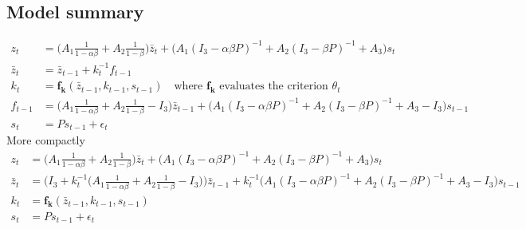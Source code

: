 \documentclass[11pt]{article}
\renewcommand{\[}{\begin{equation}}
\renewcommand{\]}{\end{equation}}
\begin{document}
\subsection{Model summary}
\begin{align}
z_t & = \bigg(A_1\frac{1}{1-\alpha\beta} +A_2\frac{1}{1-\beta}\bigg)\bar{z}_t + \bigg(A_1(I_3 - \alpha\beta P)^{-1} +A_2(I_3 - \beta P)^{-1} +A_3\bigg)s_t \tag{ALM} \\
\bar{z}_t & = \bar{z}_{t-1} + k_t^{-1} f_{t-1} \tag{Drift LOM}\\
k_t & = \mathbf{f_k}(\bar{z}_{t-1}, k_{t-1}, s_{t-1})  \quad \text{where $\mathbf{f_k}$ evaluates the criterion $\theta_t$}\tag{Gain LOM} \\
f_{t-1} & = \bigg(A_1\frac{1}{1-\alpha\beta} +A_2\frac{1}{1-\beta} -I_3\bigg)\bar{z}_{t-1} + \bigg(A_1(I_3 - \alpha\beta P)^{-1} +A_2(I_3 - \beta P)^{-1} +A_3 -I_3\bigg)s_{t-1} \\
s_t &= Ps_{t-1} +\epsilon_t \tag{exog. process}
\end{align}
More compactly
\begin{align*}
z_t & = \bigg(A_1\frac{1}{1-\alpha\beta} +A_2\frac{1}{1-\beta}\bigg)\bar{z}_t + \bigg(A_1(I_3 - \alpha\beta P)^{-1} +A_2(I_3 - \beta P)^{-1} +A_3\bigg)s_t \\
\bar{z}_t & = \bigg( I_3 + k_t^{-1}\bigg(A_1\frac{1}{1-\alpha\beta} +A_2\frac{1}{1-\beta} -I_3\bigg) \bigg) \bar{z}_{t-1} + k_t^{-1} \bigg(A_1(I_3 - \alpha\beta P)^{-1} +A_2(I_3 - \beta P)^{-1} +A_3 -I_3\bigg)s_{t-1} \\
k_t & = \mathbf{f_k}(\bar{z}_{t-1}, k_{t-1}, s_{t-1})  \\
s_t &= Ps_{t-1} +\epsilon_t 
\end{align*}

	



 
 
\end{document}
